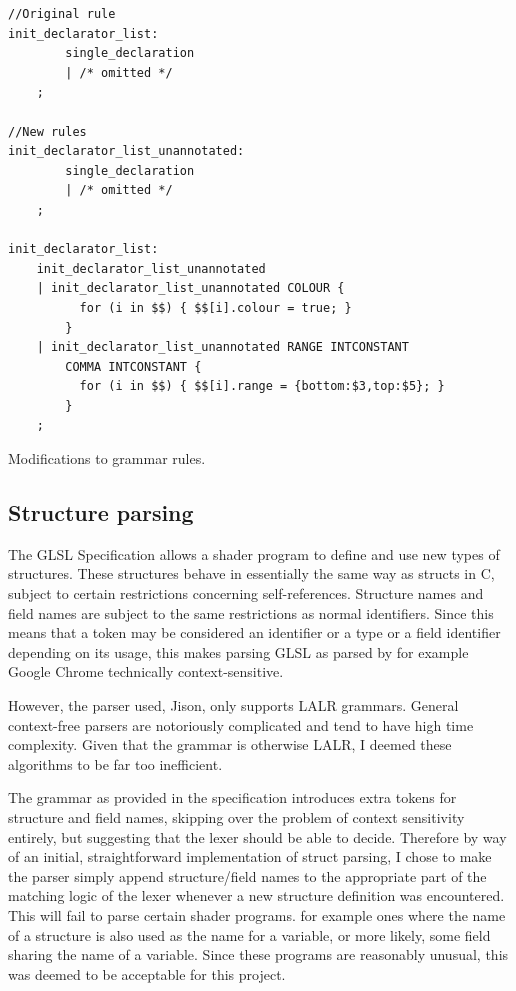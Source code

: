 \documentclass[12pt,twoside,notitlepage]{report}
\begin{document}
\begin{listing}
\begin{verbatim}
//Original rule
init_declarator_list:
        single_declaration
        | /* omitted */
	;

//New rules
init_declarator_list_unannotated:
        single_declaration
        | /* omitted */
	;

init_declarator_list:
	init_declarator_list_unannotated
	| init_declarator_list_unannotated COLOUR { 
          for (i in $$) { $$[i].colour = true; } 
        }
	| init_declarator_list_unannotated RANGE INTCONSTANT 
        COMMA INTCONSTANT { 
          for (i in $$) { $$[i].range = {bottom:$3,top:$5}; } 
        }
	;
\end{verbatim}
\caption{Modifications to grammar rules.\label{rules}}
\end{listing}

\subsection{Structure parsing}
\label{struct-parse}
The GLSL Specification \citep{glsl-spec} allows a shader program to define and use new types of structures. These structures behave in essentially the same way as structs in C, subject to certain restrictions concerning self-references. Structure names and field names are subject to the same restrictions as normal identifiers. Since this means that a token may be considered an identifier or a type or a field identifier depending on its usage, this makes parsing GLSL as parsed by for example Google Chrome technically context-sensitive. 

However, the parser used, Jison, only supports LALR grammars. General context-free parsers are notoriously complicated and tend to have high time complexity. Given that the grammar is otherwise LALR, I deemed these algorithms to be far too inefficient.

The grammar as provided in the specification introduces extra tokens for structure and field names, skipping over the problem of context sensitivity entirely, but suggesting that the lexer should be able to decide. Therefore by way of an initial, straightforward implementation of struct parsing, I chose to make the parser simply append structure/field names to the appropriate part of the matching logic of the lexer whenever a new structure definition was encountered. This will fail to parse certain shader programs. for example ones where the name of a structure is also used as the name for a variable, or more likely, some field sharing the name of a variable. Since these programs are reasonably unusual, this was deemed to be acceptable for this project.
\end{document}
